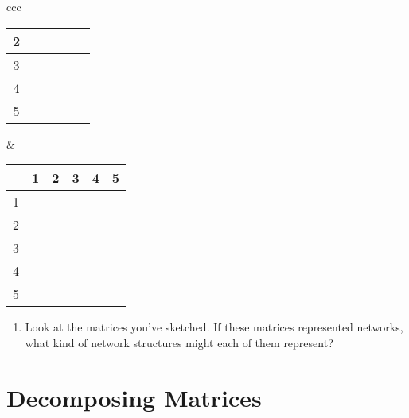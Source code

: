 \documentclass[a4paper, 14pt]{extarticle}
\begin{document}
\begin{enumerate}
\begin{center}
\begin{tabular}{ccc}
\begin{tabular}{|c|c|c|c|c|c|}
        2 & & & & & \\
        \hline
        3 & & & & & \\
        \hline
        4 & & & & & \\
        \hline
        5 & & & & & \\
        \hline
        \end{tabular}
        &
        \begin{tabular}{|c|c|c|c|c|c|}
        \hline
        & 1 & 2 & 3 & 4 & 5 \\
        \hline
        1 & & & & & \\
        \hline
        2 & & & & & \\
        \hline
        3 & & & & & \\
        \hline
        4 & & & & & \\
        \hline
        5 & & & & & \\
        \hline
        \end{tabular}
    \end{tabular}
    \end{center}
\end{enumerate}

\begin{enumerate}[resume]
    \item Look at the matrices you've sketched. If these matrices represented networks, what kind of network structures might each of them represent?
\end{enumerate}

\section{Decomposing Matrices}
\end{document}
